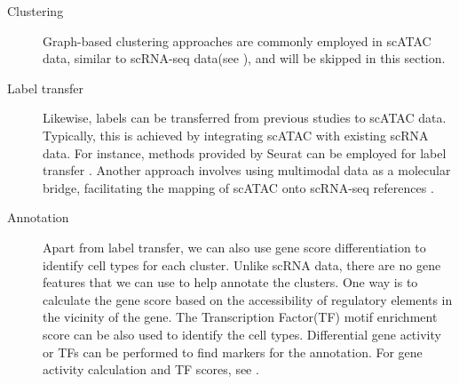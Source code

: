 \begin{description}
	 \item[Clustering]
	Graph-based clustering approaches are commonly employed in scATAC data, similar to scRNA-seq data(see ), and will be skipped in this section.	
	
	 \item[Label transfer]
	Likewise, labels can be transferred from previous studies to scATAC data. Typically, this is achieved by integrating scATAC with existing scRNA data. For instance, methods provided by Seurat can be employed for label transfer \citep{stuart2019seurat3}. Another approach involves using multimodal data as a molecular bridge, facilitating the mapping of scATAC onto scRNA-seq references \citep{hao2023dictionary}.
	
	 \item[Annotation] 
	Apart from label transfer, we can also use gene score differentiation to identify cell types for each cluster. Unlike scRNA data, there are no gene features that we can use to help annotate the clusters. One way is to calculate the gene score based on the accessibility of regulatory elements in the vicinity of the gene. The Transcription Factor(TF) motif enrichment score can be also used to identify the cell types. Differential gene activity or TFs can be performed to find markers for the annotation. For gene activity calculation and TF scores, see . 
\end{description}
